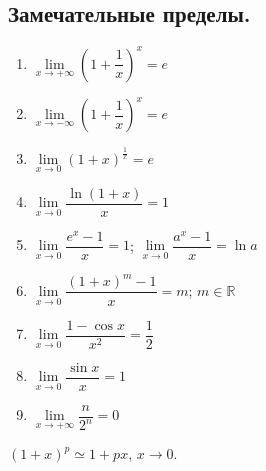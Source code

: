 \documentclass[12pt]{article}
\begin{document}
	\subsection{Замечательные пределы.}
	\begin{enumerate}
		\item $\lim\limits_{x \rightarrow +\infty} \left(1 + \dfrac{1}{x}\right)^x = e$
		\item $\lim\limits_{x \rightarrow -\infty} \left(1 + \dfrac{1}{x}\right)^x = e$
		\item $\lim\limits_{x \rightarrow 0} (1 + x)^{\frac{1}{x}} = e$
		\item $\lim\limits_{x \rightarrow 0} \dfrac{\ln (1 + x)}{x} = 1$
		\item $\lim\limits_{x \rightarrow 0} \dfrac{e^x - 1}{x} = 1$; $\lim\limits_{x \rightarrow 0} \dfrac{a^x - 1}{x} = \ln a$
		\item $\lim\limits_{x \rightarrow 0} \dfrac{(1 + x)^m - 1}{x} = m$; $m \in \mathbb{R}$
		\item $\lim\limits_{x \rightarrow 0} \dfrac{1 - \cos x}{x^2} = \dfrac{1}{2}$
		\item $\lim\limits_{x \rightarrow 0} \dfrac{\sin x}{x} = 1$
		\item $\lim\limits_{x \rightarrow +\infty} \dfrac{n}{2^n} = 0$
	\end{enumerate}
	\begin{statement}
		$(1 + x)^p \simeq 1 + px$, $x \rightarrow 0$.
	\end{statement}
\end{document}
